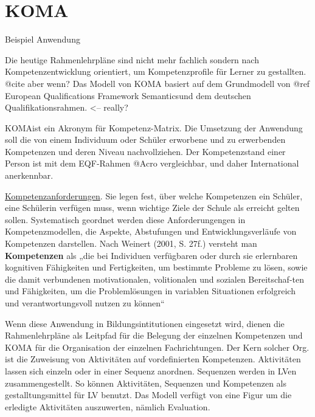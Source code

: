 \documentclass[
12pt,
english,
ngerman,
headsepline,
twoside,
openright,
numbers=noenddot,version=first
]{scrreprt}
\begin{document}



\section{KOMA}{Beispiel Anwendung}
\label{sec:KOMA}

Die heutige Rahmenlehrpläne sind nicht mehr fachlich sondern nach Kompetenzentwicklung orientiert, um Kompetenzprofile für Lerner zu gestallten. @cite aber wenn?
Das Modell von KOMA basiert auf dem Grundmodell von
@ref \glqq European Qualifications Framework Semantics\grqq und dem deutschen Qualifikationsrahmen. <-- really?

\glqq KOMA\grqq ist ein Akronym für Kompetenz-Matrix. Die Umsetzung der Anwendung soll die von einem Individuum oder Schüler
erworbene und zu erwerbenden Kompetenzen und deren Niveau nachvollziehen.
Der Kompetenzstand einer Person ist mit dem EQF-Rahmen @Acro vergleichbar, und daher International anerkennbar.

\underline{Kompetenzanforderungen}. Sie legen fest, über welche Kompetenzen ein Schüler, eine Schülerin verfügen muss, wenn wichtige Ziele der Schule als erreicht gelten sollen. Systematisch geordnet werden diese Anforderungengen in Kompetenzmodellen, die Aspekte, Abstufungen und Entwicklungsverläufe von Kompetenzen darstellen\cite{Competence}.
Nach Weinert (2001, S. 27f.) versteht man \textbf{Kompetenzen} als „die bei Individuen verfügbaren oder durch sie erlernbaren kognitiven Fähigkeiten und Fertigkeiten, um bestimmte Probleme zu lösen, sowie die damit verbundenen motivationalen, volitionalen und sozialen Bereitschaf-ten und Fähigkeiten, um die Problemlösungen in variablen Situationen erfolgreich und verantwortungsvoll nutzen zu können“\cite{Competence}


Wenn diese Anwendung in Bildungsintitutionen eingesetzt wird, dienen die Rahmenlehrpläne als Leitpfad für die Belegung der einzelnen Kompetenzen
und KOMA für die Organisation der einzelnen Fachrichtungen. Der Kern solcher Org. ist die Zuweisung von Aktivitäten auf vordefinierten Kompetenzen.
Aktivitäten lassen sich einzeln oder in einer Sequenz anordnen. Sequenzen werden in LVen zusammengestellt. So können Aktivitäten, Sequenzen und Kompetenzen
als gestalltungsmittel für LV benutzt. Das Modell verfügt von eine Figur um die erledigte Aktivitäten auszuwerten, nämlich Evaluation.
\end{document}
